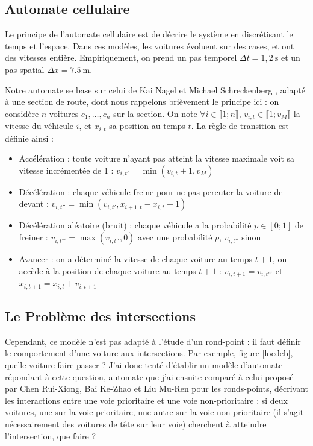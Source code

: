 \documentclass[11pt]{article}
\begin{document}
	\subsection{Automate cellulaire}
	Le principe de l'automate cellulaire est de décrire le système en discrétisant le temps et l'espace. Dans ces modèles, les voitures évoluent sur des cases, et ont des vitesses entière. Empiriquement, on prend un pas temporel $\Delta t = 1,2~\mathrm{s}$ et un pas spatial $\Delta x = 7.5~\mathrm{m}$. \par
	Notre automate se base sur celui de Kai Nagel et Michael Schreckenberg \cite{NaSch}, adapté à une section de route, 
dont nous rappelons brièvement le principe ici : on considère $n$ voitures $c_1, … , c_n$ sur la section. On note $\forall i \in \llbracket 1;n \rrbracket$, $v_{i,t} \in \llbracket 1;v_M \rrbracket$ la vitesse du véhicule $i$, et $x_{i,t}$ sa position au temps $t$. La règle de transition est définie ainsi :
	\begin{itemize}
		\item Accélération : toute voiture n'ayant pas atteint la vitesse maximale voit sa vitesse incrémentée de 1 : $v_{i,t'} = \min(v_{i,t} + 1, v_M)$
		\item Décélération : chaque véhicule freine pour ne pas percuter la voiture de devant : $v_{i,t''} = \min(v_{i,t'},x_{i+1,t}-x_{i,t}-1)$
		\item Décélération aléatoire (bruit) : chaque véhicule a la probabilité $p \in [ 0;1 ]$ de freiner : $v_{i,t'''} = \max(v_{i,t''},0)$ avec une probabilité $p$, $v_{i,t''}$ sinon
		\item Avancer : on a déterminé la vitesse de chaque voiture au temps $t+1$, on accède à la position de chaque voiture au temps $t+1$ : $v_{i,t+1} = v_{i,t'''}$ et $x_{i,t+1} = x_{i,t} + v_{i,t+1}$
	\end{itemize}
	
	\subsection{Le Problème des intersections}
	Cependant, ce modèle n'est pas adapté à l'étude d'un rond-point : il faut définir le comportement d'une voiture aux intersections. Par exemple, figure \ref{locdeb}, quelle voiture faire passer ? J'ai donc tenté d'établir un modèle d'automate répondant à cette question, automate que j'ai ensuite comparé à celui proposé par Chen Rui-Xiong, Bai Ke-Zhao et Liu Mu-Ren\cite{ChPh} pour les ronds-points, décrivant les interactions entre une voie prioritaire et une voie non-prioritaire : si deux voitures, une sur la voie prioritaire, une autre sur la voie non-prioritaire (il s'agit nécessairement des voitures de tête sur leur voie) cherchent à atteindre l'intersection, que faire ?
\end{document}
